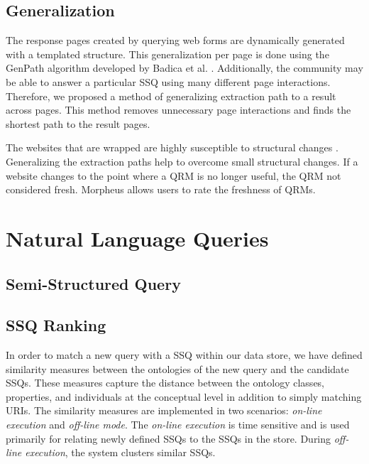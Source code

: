 \documentclass{www2010-submission}
\begin{document}


\subsection{Generalization}
The response pages created by querying web forms are dynamically generated with a templated structure. This generalization per page is done using the GenPath algorithm developed by Badica et al. \cite{Badica06}. Additionally, the community may be able to answer a particular SSQ using many different page interactions. Therefore, we proposed a method of generalizing extraction path to a result across pages. This method removes unnecessary page interactions and finds the shortest path to the result pages.

The websites that are wrapped are highly susceptible to structural changes \cite{TanZMG07}. Generalizing the extraction paths help to overcome small structural changes. If a website changes to the point where a QRM is no longer useful, the QRM not considered fresh. Morpheus allows users to rate the freshness of QRMs.



\section{Natural Language Queries}
\subsection{Semi-Structured Query}
\subsection{SSQ Ranking}
In order to match a new query with a SSQ within our data store, we have defined similarity measures between the ontologies of the new query and the candidate SSQs. These measures capture the distance between the ontology classes, properties, and individuals at the conceptual level in addition to simply matching URIs. The similarity measures are implemented in two scenarios: \textit{on-line execution} and \textit{off-line mode}. The \textit{on-line execution} is time sensitive and is used primarily for relating newly defined SSQs to the SSQs in the store. During \textit{off-line execution}, the system clusters similar SSQs.
\end{document}
